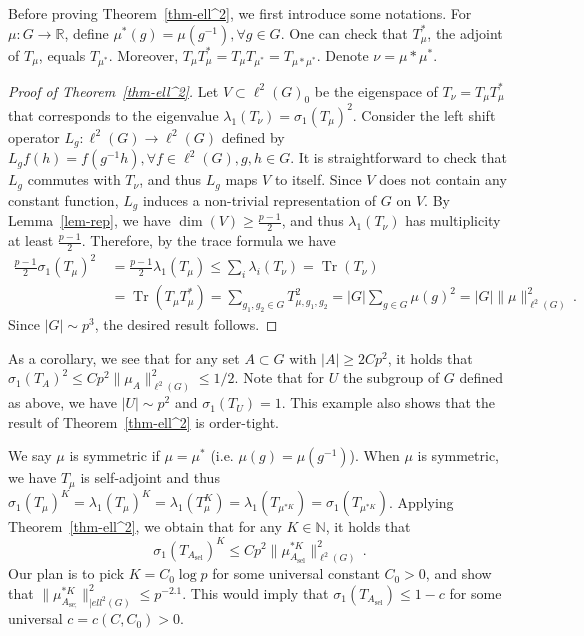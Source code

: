 \documentclass[12pt]{amsart}
\begin{document}
Before proving Theorem~\ref{thm-ell^2}, we first introduce some notations. For $\mu:G\to \mathbb{R}$, define $\mu^*(g)=\mu(g^{-1}),\forall g\in G$. One can check that $T_\mu^*$, the adjoint of $T_\mu$, equals $T_{\mu^*}$. Moreover, $T_{\mu}T_\mu^*=T_{\mu}T_{\mu^*}=T_{\mu\ast \mu^*}$. Denote $\nu=\mu\ast \mu^*$. 

\begin{proof}[Proof of Theorem~\ref{thm-ell^2}]
    Let $V\subset \ell^2(G)_0$ be the eigenspace of $T_{\nu}=T_\mu T_\mu^*$ that corresponds to the eigenvalue $\lambda_1(T_\nu)=\sigma_1(T_\mu)^2$. Consider the left shift operator $L_g:\ell^2(G)\to \ell^2(G)$ defined by $L_gf(h)=f(g^{-1}h),\forall f\in \ell^2(G),g,h\in G$. It is straightforward to check that $L_g$ commutes with $T_\nu$, and thus $L_g$ maps $V$ to itself. Since $V$ does not contain any constant function, $L_g$ induces a non-trivial representation of $G$ on $V$. By Lemma~\ref{lem-rep}, we have $\operatorname{dim}(V)\ge \frac{p-1}{2}$, and thus $\lambda_1(T_\nu)$ has multiplicity at least $\frac{p-1}{2}$. Therefore,
    by the trace formula we have
    \begin{align*}
    \frac{p-1}{2}\sigma_1(T_\mu)^2&\ =\frac{p-1}{2}\lambda_1(T_\mu)\le \sum_i \lambda_i(T_\nu)=\operatorname{Tr}(T_\nu)\\&\ =\operatorname{Tr}(T_\mu T_\mu^*)=\sum_{g_1,g_2\in G}T_{\mu,g_1,g_2}^2=|G|\sum_{g\in G}\mu(g)^2=|G|\|\mu\|^2_{\ell^2(G)}\,.
    \end{align*}
    Since $|G|\sim p^3$, the desired result follows.
\end{proof}
As a corollary, we see that for any set $A\subset G$ with $|A|\ge 2Cp^2$, it holds that $\sigma_1(T_A)^2\le Cp^2\|\mu_A\|_{\ell^2(G)}^2\le 1/2$. Note that for $U$ the subgroup of $G$ defined as above, we have $|U|\sim p^2$ and $\sigma_1(T_U)=1$. This example also shows that the result of Theorem~\ref{thm-ell^2} is order-tight.

We say $\mu$ is symmetric if $\mu=\mu^*$ (i.e. $\mu(g)=\mu(g^{-1})$). When $\mu$ is symmetric, we have $T_\mu$ is self-adjoint and thus $\sigma_1(T_\mu)^K=\lambda_1(T_\mu)^K=\lambda_1(T_\mu^K)=\lambda_1(T_{\mu^{\ast K}})=\sigma_1(T_{\mu^{\ast K}})$. Applying Theorem~\ref{thm-ell^2}, we obtain that for any $K\in \mathbb{N}$, it holds that
\[
\sigma_1(T_{A_{\operatorname{sel}}})^K\le Cp^2\|\mu_{A_{\operatorname{sel}}}^{\ast K}\|^2_{\ell^2(G)}\,.
\]
Our plan is to pick $K=C_0\log p$ for some universal constant $C_0>0$, and show that $\|\mu_{A_{\operatorname{se;}}}^{\ast K}\|^2_{|ell^2(G)}\le p^{-2.1}$. This would imply that $\sigma_1(T_{A_{\operatorname{sel}}})\le 1-c$ for some universal $c=c(C,C_0)>0$. 
\end{document}
